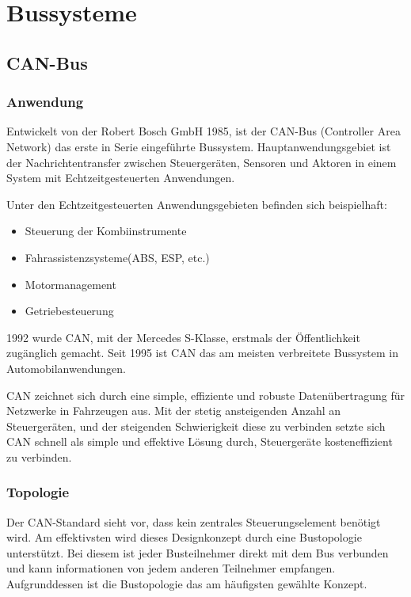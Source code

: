 

\section{Bussysteme}

\subsection{CAN-Bus}
    \subsubsection{Anwendung}
    Entwickelt von der Robert Bosch GmbH 1985, ist der CAN-Bus (Controller Area Network) 
    das erste in Serie eingeführte Bussystem. Hauptanwendungsgebiet ist der
    Nachrichtentransfer zwischen Steuergeräten, Sensoren und Aktoren in 
    einem System mit Echtzeitgesteuerten Anwendungen.~\cite{LA_CAN1}

    Unter den Echtzeitgesteuerten Anwendungsgebieten befinden sich beispielhaft:
    \begin{itemize}
    \item Steuerung der Kombiinstrumente
    \item Fahrassistenzsysteme(ABS, ESP, etc.)
    \item Motormanagement
    \item Getriebesteuerung
    \end{itemize}
    1992 wurde CAN, mit der Mercedes S-Klasse, erstmals der Öffentlichkeit zugänglich gemacht. 
    Seit 1995 ist CAN das am meisten verbreitete Bussystem in Automobilanwendungen.
 
    CAN zeichnet sich durch eine simple, effiziente und robuste Datenübertragung für Netzwerke in 
    Fahrzeugen aus. Mit der stetig ansteigenden Anzahl an Steuergeräten, und der steigenden 
    Schwierigkeit diese zu verbinden setzte sich CAN schnell als simple und effektive 
    Lösung durch, Steuergeräte kosteneffizient zu verbinden.~\cite{LA_CAN2}

    \subsubsection{Topologie}
    Der CAN-Standard sieht vor, dass kein zentrales Steuerungselement benötigt wird.
    Am effektivsten wird dieses Designkonzept durch eine Bustopologie unterstützt. Bei diesem
    ist jeder Busteilnehmer direkt mit dem Bus verbunden und kann informationen von jedem anderen
    Teilnehmer empfangen. Aufgrunddessen ist die Bustopologie das am häufigsten gewählte Konzept.
    ~\cite{reif2011bosch}
    
